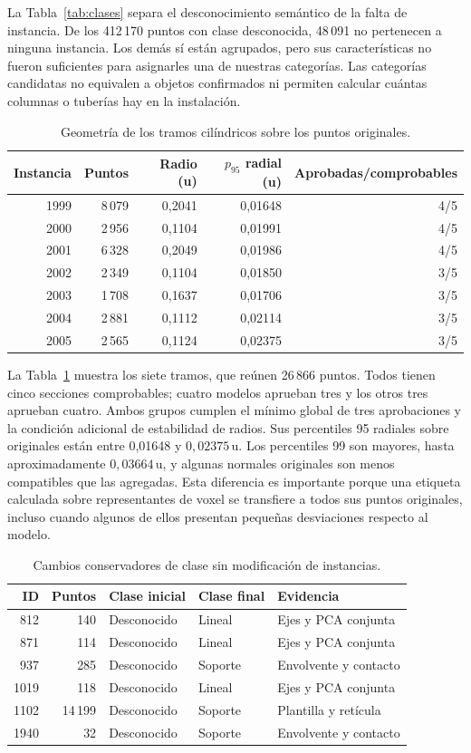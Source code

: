 \documentclass[journal,onecolumn]{IEEEtran}
\newcommand{\ucoord}{\,\mathrm{u}}
\begin{document}
La Tabla~\ref{tab:clases} separa el desconocimiento semántico de la falta de instancia. De los 412\,170 puntos con clase desconocida, 48\,091 no pertenecen a ninguna instancia. Los demás sí están agrupados, pero sus características no fueron suficientes para asignarles una de nuestras categorías. Las categorías candidatas no equivalen a objetos confirmados ni permiten calcular cuántas columnas o tuberías hay en la instalación.
\begin{table}[H]
\centering\caption{Geometría de los tramos cilíndricos sobre los puntos originales.}\label{tab:cilindros}
\small
\begin{tabular}{rrrrr}\toprule
Instancia & Puntos & Radio (u) & $p_{95}$ radial (u) & Aprobadas/comprobables\\\midrule
1999 & 8\,079 & 0,2041 & 0,01648 & 4/5\\
2000 & 2\,956 & 0,1104 & 0,01991 & 4/5\\
2001 & 6\,328 & 0,2049 & 0,01986 & 4/5\\
2002 & 2\,349 & 0,1104 & 0,01850 & 3/5\\
2003 & 1\,708 & 0,1637 & 0,01706 & 3/5\\
2004 & 2\,881 & 0,1112 & 0,02114 & 3/5\\
2005 & 2\,565 & 0,1124 & 0,02375 & 3/5\\
\bottomrule\end{tabular}
\end{table}

La Tabla~\ref{tab:cilindros} muestra los siete tramos, que reúnen 26\,866 puntos. Todos tienen cinco secciones comprobables; cuatro modelos aprueban tres y los otros tres aprueban cuatro. Ambos grupos cumplen el mínimo global de tres aprobaciones y la condición adicional de estabilidad de radios. Sus percentiles 95 radiales sobre originales están entre 0,01648 y $0,02375\ucoord$. Los percentiles 99 son mayores, hasta aproximadamente $0,03664\ucoord$, y algunas normales originales son menos compatibles que las agregadas. Esta diferencia es importante porque una etiqueta calculada sobre representantes de voxel se transfiere a todos sus puntos originales, incluso cuando algunos de ellos presentan pequeñas desviaciones respecto al modelo.
\begin{table}[H]
\centering\caption{Cambios conservadores de clase sin modificación de instancias.}\label{tab:reclases}
\small
\begin{tabular}{rrlll}\toprule
ID & Puntos & Clase inicial & Clase final & Evidencia\\\midrule
812 & 140 & Desconocido & Lineal & Ejes y PCA conjunta\\
871 & 114 & Desconocido & Lineal & Ejes y PCA conjunta\\
937 & 285 & Desconocido & Soporte & Envolvente y contacto\\
1019 & 118 & Desconocido & Lineal & Ejes y PCA conjunta\\
1102 & 14\,199 & Desconocido & Soporte & Plantilla y retícula\\
1940 & 32 & Desconocido & Soporte & Envolvente y contacto\\
\bottomrule\end{tabular}
\end{table}
\end{document}
